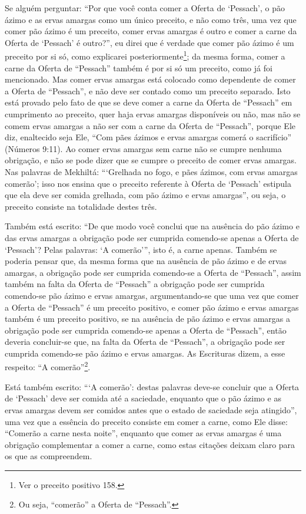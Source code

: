 Se alguém perguntar: ``Por que você conta comer a Oferta de `Pessach', o
pão ázimo e as ervas amargas como um único preceito, e não como três,
uma vez que comer pão ázimo é um preceito, comer ervas amargas é outro
e comer a carne da Oferta de `Pessach' é outro?'', eu direi que é verdade
que comer pão ázimo é um preceito por si só, como explicarei
posteriormente\footnote{Ver o preceito positivo 158.}; da mesma forma, comer a carne da
Oferta de ``Pessach'' também é por si só um preceito, como já foi
mencionado. Mas comer ervas amargas está colocado como dependente de
comer a Oferta de ``Pessach'', e não deve ser contado como um preceito
separado. Isto está provado pelo fato de que se deve comer a carne da
Oferta de ``Pessach'' em cumprimento ao preceito, quer haja ervas amargas
disponíveis ou não, mas não se comem ervas amargas
a não ser com a carne da Oferta de ``Pessach'', porque Ele diz,
enaltecido seja Ele, ``Com pães ázimos e ervas amargas comerá o
sacrifício'' (Números 9:11). Ao comer ervas amargas sem carne não se
cumpre nenhuma obrigação, e não se pode dizer que se cumpre o preceito
de comer ervas amargas. Nas palavras de Mekhiltá: ```Grelhada no fogo, e
pães ázimos, com ervas amargas comerão'; isso nos ensina que o preceito
referente à Oferta de `Pessach' estipula que ela deve ser comida
grelhada, com pão ázimo e ervas amargas'', ou seja, o preceito consiste
na totalidade destes três.

Também está escrito: ``De que modo você conclui que na ausência do pão
ázimo e das ervas amargas a obrigação pode ser cumprida comendo-se
apenas a Oferta de `Pessach'? Pelas palavras: `A comerão''', isto é, a
carne apenas. Também se poderia pensar que, da mesma forma que na
ausência de pão ázimo e de ervas amargas, a obrigação pode ser cumprida
comendo-se a Oferta de ``Pessach'', assim também na falta da Oferta de
``Pessach'' a obrigação pode ser cumprida comendo-se pão ázimo e ervas
amargas, argumentando-se que uma vez que comer a Oferta de ``Pessach'' é
um preceito positivo, e comer pão ázimo e ervas amargas também é um
preceito positivo, se na ausência de pão ázimo e ervas amargas a
obrigação pode ser cumprida comendo-se apenas a Oferta de ``Pessach'',
então deveria concluir-se que, na falta da Oferta de ``Pessach'', a
obrigação pode ser cumprida comendo-se pão ázimo e ervas amargas. As
Escrituras dizem, a esse respeito: ``A comerão''\footnote{Ou seja, ``comerão'' a Oferta de ``Pessach''.}.

Está também escrito: ```A comerão': destas palavras deve-se concluir que
a Oferta de `Pessach' deve ser comida até a saciedade, enquanto que o pão
ázimo e as ervas amargas devem ser comidos antes que o estado de
saciedade seja atingido'', uma vez que a essência do preceito consiste
em comer a carne, como Ele disse: ``Comerão a carne nesta noite'',
enquanto que comer as ervas amargas é uma obrigação complementar a comer
a carne, como estas citações deixam claro para os que as compreendem.

